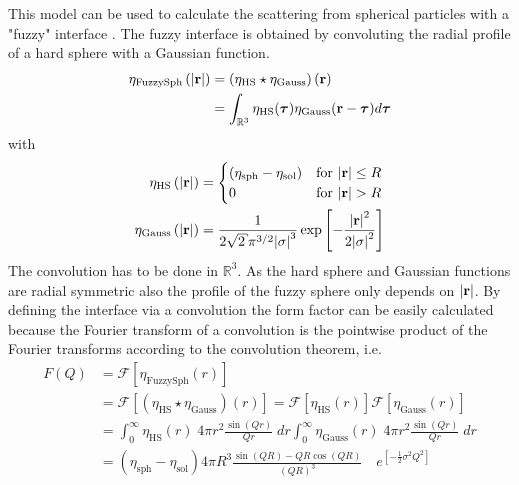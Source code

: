 This model can be used to calculate the scattering from spherical
particles with a "fuzzy" interface \cite{Stieger2004}. The fuzzy
interface is obtained by convoluting the radial profile of a hard
sphere with a Gaussian function.
\begin{align}
\eta_\text{FuzzySph}\left(\abs{\mathbf{r}}\right)
        &= \left(\eta_\text{HS}\star\eta_\text{Gauss}\right)(\mathbf{r}) \nonumber \\
        &= \int_{\mathbb{R}^3}\eta_\text{HS}(\boldsymbol{\tau}) \eta_\text{Gauss}(\mathbf{r}-\boldsymbol{\tau}) d\boldsymbol{\tau}
\end{align}
with
\begin{subequations}
\begin{align}
\eta_\text{HS}\left(\abs{\mathbf{r}}\right) &=
\begin{cases}
\left(\eta_\text{sph}-\eta_\text{sol}\right) & \mbox{for~} \abs{\mathbf{r}}\leq R \\
0 & \mbox{for~} \abs{\mathbf{r}}>R
\end{cases} \\
\eta_\text{Gauss}\left(\abs{\mathbf{r}}\right) &= \frac{1}{2 \sqrt{2} \pi^{3/2}
\abs{\sigma}^3} \exp\left[ -\frac{\abs{\mathbf{r}}^2}{2
\abs{\sigma}^2}\right]
\end{align}
\end{subequations}
The convolution has to be done in $\mathbb{R}^3$. As the hard
sphere and Gaussian functions are radial symmetric also the
profile of the fuzzy sphere only depends on $\abs{\mathbf{r}}$. By
defining the interface via a convolution the form factor can be
easily calculated because the Fourier transform of a convolution
is the pointwise product of the Fourier transforms according to
the convolution theorem, i.e.
\begin{equation}
\begin{split}
F(Q) &= \mathcal{F}\left[\eta_\text{FuzzySph}(r) \right] \\
&=
  \mathcal{F}\left[\left(\eta_\text{HS}\star\eta_\text{Gauss}\right)(r)\right]
= \mathcal{F}\left[\eta_\text{HS}(r)\right] \mathcal{F}\left[\eta_\text{Gauss}(r)\right] \\
&=
   \int_0^{\infty} \eta_\text{HS}(r)\; 4\pi r^2\frac{\sin\left(Qr\right)}{Qr} \; dr \int_0^{\infty} \eta_\text{Gauss}(r)\; 4\pi r^2\frac{\sin\left(Qr\right)}{Qr} \; dr \\
&= \left(\eta_\text{sph}-\eta_\text{sol}\right) 4\pi R^3%
   \frac{\sin\left(QR\right)-QR\cos\left(QR\right)}{\left(QR\right)^3} \quad e^{\left[-\frac{1}{2}\sigma^2Q^2\right]}
\end{split}
\end{equation}

